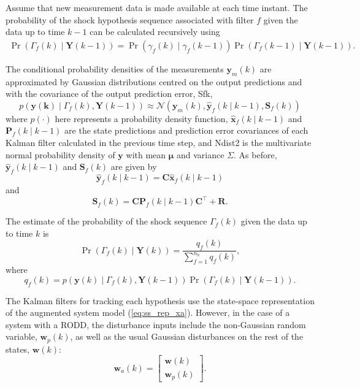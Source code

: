 Assume that new measurement data is made available at each time instant. The probability of the shock hypothesis sequence associated with filter $f$ given the data up to time $k-1$ can be calculated recursively using
\begin{multline} \label{eq:Pr_Gammakp1_given_Yk}
	\Pr(\Gamma_f(k) \mid \mathbf{Y}(k-1)) = 
	\Pr(\gamma_f(k) \mid \gamma_f(k-1)) \Pr(\Gamma_f(k-1) \mid \mathbf{Y}(k-1)).
\end{multline}

The conditional probability densities of the measurements $\mathbf{y}_m(k)$ are approximated by Gaussian distributions centred on the output predictions and with the covariance of the output prediction error, \gls{Sfk},
\begin{equation} \label{eq:p_yk_given_Gammak_Ykm1}
	p(\mathbf{y(k)} \mid \Gamma_f(k), \mathbf{Y}(k-1)) \approx \mathcal{N}\left(\mathbf{y}_m(k), \mathbf{\hat{y}}_{f}(k \mid k-1),	\mathbf{S}_f(k) \right)
\end{equation}
where $p(\cdot)$ here represents a probability density function, $\mathbf{\hat{x}}_{f}(k \mid k-1)$ and $\mathbf{P}_f(k \mid k-1)$ are the state predictions and prediction error covariances of each Kalman filter calculated in the previous time step, and \gls{Ndist2} is the multivariate normal probability density of $\mathbf{y}$ with mean $\mathbf{\mu}$ and variance $\Sigma$. As before, $\mathbf{\hat{y}}_{f}(k \mid k-1)$ and $\mathbf{S}_f(k) $ are given by 
\begin{equation} \label{eq:yfk_pred}
	\mathbf{\hat{y}}_{f}(k \mid k-1) = \mathbf{C}\mathbf{\hat{x}}_{f}(k \mid k-1)
\end{equation}
and
\begin{equation} \label{eq:Sfk}
	\mathbf{S}_f(k) = \mathbf{C}\mathbf{P}_f(k \mid k-1)\mathbf{C}^\intercal + \mathbf{R}.
\end{equation}

The estimate of the probability of the shock sequence $\Gamma_f(k)$ given the data up to time $k$ is
\begin{equation} \label{eq:Pr_Gammak_given_Yk}
	\Pr(\Gamma_f(k) \mid \mathbf{Y}(k)) = \frac{q_f(k)}{\sum_{f=1}^{n_h} q_f(k)},
\end{equation}
where
\begin{equation} \label{eq:qfk}
	q_f(k) = p(\mathbf{y}(k) \mid \Gamma_f(k), \mathbf{Y}(k-1)) \Pr(\Gamma_f(k) \mid \mathbf{Y}(k-1)).
\end{equation}

The Kalman filters for tracking each hypothesis use the state-space representation of the augmented system model (\ref{eq:ss_rep_xa}). 
However, in the case of a system with a RODD, the disturbance inputs include the non-Gaussian random variable, $\mathbf{w}_p(k)$, as well as the usual Gaussian disturbances on the rest of the states, $\mathbf{w}(k)$:
\begin{equation} \label{eq:wak}
	\mathbf{w}_a(k) = \begin{bmatrix}
		\mathbf{w}(k) \\
		\mathbf{w}_p(k)
	\end{bmatrix}.
\end{equation}


